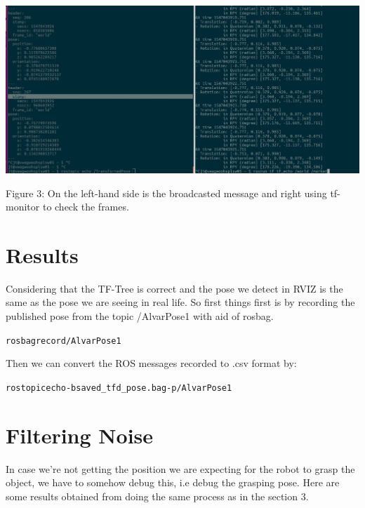 \documentclass{article}
\begin{document}
\begin{center}
  \includegraphics[scale=0.3]{pictures/pic3.jpeg}

  Figure 3:  On the left-hand side is the broadcasted message and right using tf-monitor to check the frames.
\end{center}

\section{Results}
Considering that the TF-Tree is correct and the pose we detect in RVIZ is the same as the pose we are seeing in real life. 
So first things first is by recording the published pose from the topic /AlvarPose1 with aid of rosbag.
\begin{alltt}
    rosbag record /AlvarPose1
\end{alltt}
Then we can convert the ROS messages recorded to .csv format by:
\begin{alltt}
    rostopic echo -b saved_tfd_pose.bag -p /AlvarPose1
\end{alltt}


\section{Filtering Noise}
In case we're not getting the position we are expecting for the robot to grasp the object, we have to somehow debug this, i.e debug the grasping pose. Here are some results obtained from doing the same process as in the section 3.
\end{document}
